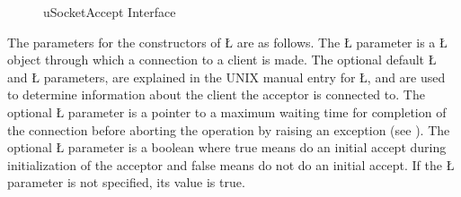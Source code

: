\documentclass[openright,twoside]{report}
\begin{document}
\begin{figure}
%
%
%
%
%
%
\caption{{\BGfont uSocketAccept} Interface}
\label{f:uSocketAcceptInterface}
\end{figure}

The parameters for the constructors of \LGinlinetrue\LGbegin\lgrinde\L{}\endlgrinde\LGend{} are as follows.
The \LGinlinetrue\LGbegin\lgrinde\L{}\endlgrinde\LGend{} parameter is a \LGinlinetrue\LGbegin\lgrinde\L{}\endlgrinde\LGend{} object through which a connection to a client is made.
The optional default \LGinlinetrue\LGbegin\lgrinde\L{}\endlgrinde\LGend{} and \LGinlinetrue\LGbegin\lgrinde\L{}\endlgrinde\LGend{} parameters, are explained in the UNIX manual entry for \LGinlinetrue\LGbegin\lgrinde\L{}\endlgrinde\LGend{}, and are used to determine information about the client the acceptor is connected to.
The optional \LGinlinetrue\LGbegin\lgrinde\L{}\endlgrinde\LGend{} parameter is a pointer to a maximum waiting time for completion of the connection before aborting the operation by raising an exception (see ).
The optional \LGinlinetrue\LGbegin\lgrinde\L{}\endlgrinde\LGend{} parameter is a boolean where true means do an initial accept during initialization of the acceptor and false means do not do an initial accept.
If the \LGinlinetrue\LGbegin\lgrinde\L{}\endlgrinde\LGend{} parameter is not specified, its value is true.
\end{document}
